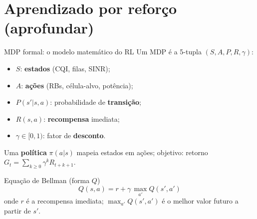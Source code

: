 \documentclass[aspectratio=169,11pt]{beamer}
\begin{document}
\section{Aprendizado por reforço (aprofundar)}

\begin{frame}{MDP formal: o modelo matemático do RL}
  Um MDP é a 5-tupla $(S, A, P, R, \gamma)$:
  \begin{itemize}\footnotesize
    \item $S$: \textbf{estados} (CQI, filas, SINR);
    \item $A$: \textbf{ações} (RBs, célula-alvo, potência);
    \item $P(s'|s,a)$: probabilidade de \textbf{transição};
    \item $R(s,a)$: \textbf{recompensa} imediata;
    \item $\gamma\in[0,1)$: fator de \textbf{desconto}.
  \end{itemize}
  \small Uma \textbf{política} $\pi(a|s)$ mapeia estados em ações; objetivo: retorno $G_t = \sum_{k\ge 0}\gamma^k R_{t+k+1}$.
  \begin{center}
  \end{center}
  \pause
  \begin{block}{Equação de Bellman (forma $Q$)}
    $$Q(s,a) = r + \gamma\,\max_{a'} Q(s',a')$$
    \small onde $r$ é a recompensa imediata; $\max_{a'} Q(s',a')$ é o melhor valor futuro a partir de $s'$.
  \end{block}
\end{frame}
\end{document}
